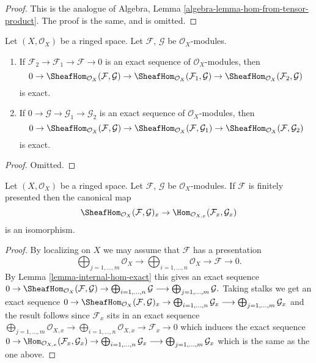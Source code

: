 \begin{proof}
This is the analogue of
Algebra, Lemma \ref{algebra-lemma-hom-from-tensor-product}.
The proof is the same, and is omitted.
\end{proof}

\begin{lemma}
\label{lemma-internal-hom-exact}
Let $(X, \mathcal{O}_X)$ be a ringed space.
Let $\mathcal{F}$, $\mathcal{G}$ be $\mathcal{O}_X$-modules.
\begin{enumerate}
\item If $\mathcal{F}_2 \to \mathcal{F}_1 \to \mathcal{F} \to 0$
is an exact sequence of $\mathcal{O}_X$-modules, then
$$
0 \to
\SheafHom_{\mathcal{O}_X}(\mathcal{F}, \mathcal{G}) \to
\SheafHom_{\mathcal{O}_X}(\mathcal{F}_1, \mathcal{G}) \to
\SheafHom_{\mathcal{O}_X}(\mathcal{F}_2, \mathcal{G})
$$
is exact.
\item If $0 \to \mathcal{G} \to \mathcal{G}_1 \to \mathcal{G}_2$
is an exact sequence of $\mathcal{O}_X$-modules, then
$$
0 \to
\SheafHom_{\mathcal{O}_X}(\mathcal{F}, \mathcal{G}) \to
\SheafHom_{\mathcal{O}_X}(\mathcal{F}, \mathcal{G}_1) \to
\SheafHom_{\mathcal{O}_X}(\mathcal{F}, \mathcal{G}_2)
$$
is exact.
\end{enumerate}
\end{lemma}

\begin{proof}
Omitted.
\end{proof}

\begin{lemma}
\label{lemma-stalk-internal-hom}
Let $(X, \mathcal{O}_X)$ be a ringed space.
Let $\mathcal{F}$, $\mathcal{G}$ be $\mathcal{O}_X$-modules.
If $\mathcal{F}$ is finitely presented then the canonical map
$$
\SheafHom_{\mathcal{O}_X}(\mathcal{F}, \mathcal{G})_x
\to
\Hom_{\mathcal{O}_{X, x}}(\mathcal{F}_x, \mathcal{G}_x)
$$
is an isomorphism.
\end{lemma}

\begin{proof}
By localizing on $X$ we may assume that $\mathcal{F}$ has a presentation
$$
\bigoplus\nolimits_{j = 1, \ldots, m}
\mathcal{O}_X
\longrightarrow
\bigoplus\nolimits_{i = 1, \ldots, n}
\mathcal{O}_X
\to
\mathcal{F}
\to
0.
$$
By Lemma \ref{lemma-internal-hom-exact} this gives an exact sequence
$
0 \to
\SheafHom_{\mathcal{O}_X}(\mathcal{F}, \mathcal{G}) \to
\bigoplus\nolimits_{i = 1, \ldots, n} \mathcal{G}
\longrightarrow
\bigoplus\nolimits_{j = 1, \ldots, m} \mathcal{G}.
$
Taking stalks we get an exact sequence
$
0 \to
\SheafHom_{\mathcal{O}_X}(\mathcal{F}, \mathcal{G})_x \to
\bigoplus\nolimits_{i = 1, \ldots, n} \mathcal{G}_x
\longrightarrow
\bigoplus\nolimits_{j = 1, \ldots, m} \mathcal{G}_x
$
and the result follows since $\mathcal{F}_x$ sits in
an exact sequence
$
\bigoplus\nolimits_{j = 1, \ldots, m}
\mathcal{O}_{X, x}
\longrightarrow
\bigoplus\nolimits_{i = 1, \ldots, n}
\mathcal{O}_{X, x}
\to
\mathcal{F}_x
\to
0
$
which induces the exact sequence
$
0 \to
\Hom_{\mathcal{O}_{X, x}}(\mathcal{F}_x, \mathcal{G}_x) \to
\bigoplus\nolimits_{i = 1, \ldots, n} \mathcal{G}_x
\longrightarrow
\bigoplus\nolimits_{j = 1, \ldots, m} \mathcal{G}_x
$
which is the same as the one above.
\end{proof}

